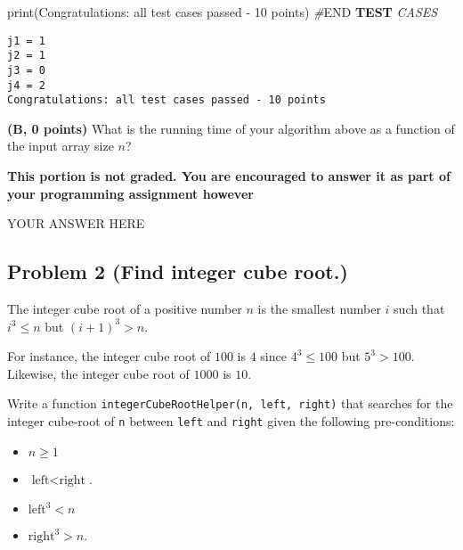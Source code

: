\documentclass[
]{article}
\newenvironment{Shaded}{}{}
\newcommand{\AlertTok}[1]{\textcolor[rgb]{1.00,0.00,0.00}{\textbf{#1}}}
\newcommand{\BuiltInTok}[1]{\textcolor[rgb]{0.00,0.50,0.00}{#1}}
\newcommand{\CommentTok}[1]{\textcolor[rgb]{0.38,0.63,0.69}{\textit{#1}}}
\newcommand{\NormalTok}[1]{#1}
\newcommand{\RegionMarkerTok}[1]{#1}
\newcommand{\StringTok}[1]{\textcolor[rgb]{0.25,0.44,0.63}{#1}}
\providecommand{\tightlist}{%
  \setlength{\itemsep}{0pt}\setlength{\parskip}{0pt}}
\begin{document}
\begin{Shaded}
\begin{Highlighting}[]
\BuiltInTok{print}\NormalTok{(}\StringTok{\textquotesingle{}Congratulations: all test cases passed {-} 10 points\textquotesingle{}}\NormalTok{)}
\CommentTok{\#}\RegionMarkerTok{END}\CommentTok{ }\AlertTok{TEST}\CommentTok{ CASES}
\end{Highlighting}
\end{Shaded}

\begin{verbatim}
j1 = 1
j2 = 1
j3 = 0
j4 = 2
Congratulations: all test cases passed - 10 points
\end{verbatim}

\textbf{(B, 0 points)} What is the running time of your algorithm above
as a function of the input array size \(n\)?

\textbf{This portion is not graded. You are encouraged to answer it as
part of your programming assignment however}

YOUR ANSWER HERE

\hypertarget{problem-2-find-integer-cube-root}{%
\subsection{Problem 2 (Find integer cube
root.)}\label{problem-2-find-integer-cube-root}}

The integer cube root of a positive number \(n\) is the smallest number
\(i\) such that \(i^3 \leq n\) but \((i+1)^3 > n\).

For instance, the integer cube root of \(100\) is \(4\) since
\(4^3 \leq 100\) but \(5^3 > 100\). Likewise, the integer cube root of
\(1000\) is \(10\).

Write a function \texttt{integerCubeRootHelper(n,\ left,\ right)} that
searches for the integer cube-root of \texttt{n} between \texttt{left}
and \texttt{right} given the following pre-conditions:

\begin{itemize}
\tightlist
\item
  \(n \geq 1\)
\item
  \(\text{left} < \text{right}\).
\item
  \(\text{left}^3 < n\)
\item
  \(\text{right}^3 > n\).
\end{itemize}
\end{document}
